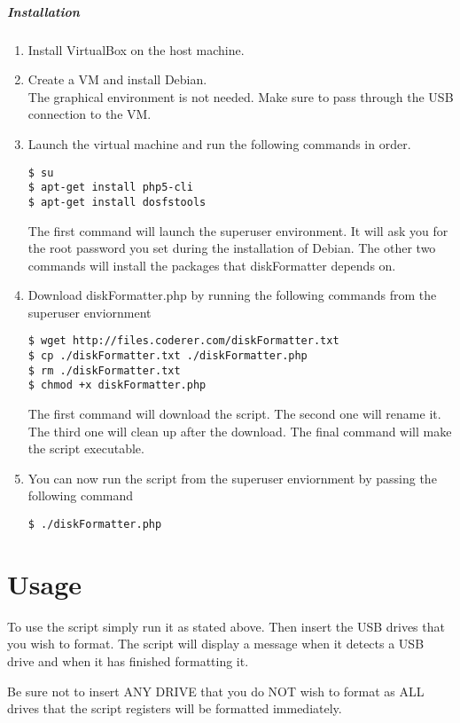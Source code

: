 \documentclass{article}
\begin{document}
\subparagraph{Installation}
\begin{enumerate}
\item Install VirtualBox on the host machine.
\item Create a VM and install Debian. \\ The graphical environment is not needed. Make sure to pass through the USB connection to the VM.
\item Launch the virtual machine and run the following commands in order. \begin{verbatim}$ su
$ apt-get install php5-cli 
$ apt-get install dosfstools\end{verbatim}
The first command will launch the superuser environment. It will ask you for the root password you set during the installation of Debian. The other two commands will install the packages that diskFormatter depends on.
\item Download diskFormatter.php by running the following commands from the superuser enviornment \begin{verbatim}$ wget http://files.coderer.com/diskFormatter.txt
$ cp ./diskFormatter.txt ./diskFormatter.php
$ rm ./diskFormatter.txt
$ chmod +x diskFormatter.php\end{verbatim}
The first command will download the script. The second one will rename it. The third one will clean up after the download. The final command will make the script executable.
\item You can now run the script from the superuser enviornment by passing the following command\begin{verbatim}$ ./diskFormatter.php\end{verbatim} 
\end{enumerate}


\section{Usage}
To use the script simply run it as stated above. Then insert the USB drives that you wish to format. The script will display a message when it detects a USB drive and when it has finished formatting it.

Be sure not to insert ANY DRIVE that you do NOT wish to format as ALL drives that the script registers will be formatted immediately.
\end{document}
